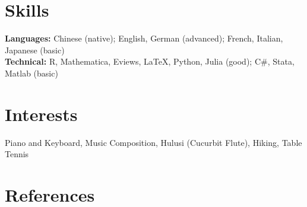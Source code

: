 \documentclass[11pt,a4paper]{article}
\begin{document}
\section*{Skills}
\textbf{Languages:} Chinese (native); English, German (advanced); French, Italian, Japanese (basic) \\
\textbf{Technical:} R, Mathematica, Eviews, LaTeX, Python, Julia (good); C\#, Stata, Matlab (basic)

\section*{Interests}
Piano and Keyboard, Music Composition, Hulusi (Cucurbit Flute), Hiking, Table Tennis

\section*{References}








\noindent
\end{document}
